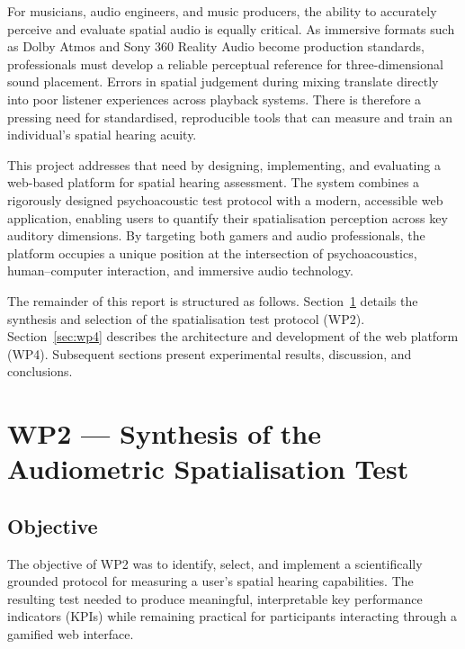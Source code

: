 For musicians, audio engineers, and music producers, the ability to accurately perceive and
evaluate spatial audio is equally critical. As immersive formats such as Dolby Atmos and
Sony 360 Reality Audio become production standards, professionals must develop a reliable
perceptual reference for three-dimensional sound placement. Errors in spatial judgement
during mixing translate directly into poor listener experiences across playback systems.
There is therefore a pressing need for standardised, reproducible tools that can measure
and train an individual's spatial hearing acuity.

This project addresses that need by designing, implementing, and evaluating a web-based
platform for spatial hearing assessment. The system combines a rigorously designed
psychoacoustic test protocol with a modern, accessible web application, enabling users
to quantify their spatialisation perception across key auditory dimensions. By targeting
both gamers and audio professionals, the platform occupies a unique position at the
intersection of psychoacoustics, human–computer interaction, and immersive audio technology.

The remainder of this report is structured as follows. Section~\ref{sec:wp2} details the
synthesis and selection of the spatialisation test protocol (WP2). Section~\ref{sec:wp4}
describes the architecture and development of the web platform (WP4). Subsequent sections
present experimental results, discussion, and conclusions.

\section{WP2 — Synthesis of the Audiometric Spatialisation Test}
\label{sec:wp2}

\subsection{Objective}

The objective of WP2 was to identify, select, and implement a scientifically grounded
protocol for measuring a user's spatial hearing capabilities. The resulting test needed
to produce meaningful, interpretable key performance indicators (KPIs) while remaining
practical for participants interacting through a gamified web interface.


